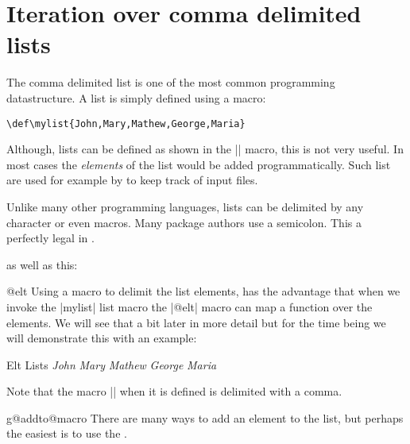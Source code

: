 \section{Iteration over comma delimited lists}

The comma delimited list is one of the most common programming datastructure. A list is simply defined using a macro:

\begin{verbatim}
\def\mylist{John,Mary,Mathew,George,Maria}
\end{verbatim}

Although, lists can be defined as shown in the |\mylist| macro, this is not very useful. In most cases the \textit{elements} of the list would be added programmatically. Such list are used for example by \latex to keep track of input files.

Unlike many other programming languages, lists can be delimited by any character or even macros. Many package authors use a semicolon. This a perfectly legal in \tex.

\begin{teXXX}
\end{teXXX}
as well as this:

\begin{teXXX}
\end{teXXX}

\begin{docCommand}{@elt}{}
Using a macro to delimit the list elements, has the advantage that when we invoke the |mylist| list macro the |@elt| macro can map a function over the elements. We will see that a bit later in more detail but for the time being we will demonstrate this with an example:
\end{docCommand}

\begin{texexample}{Elt Lists}{}
\def\mylist{\@elt John,\@elt Mary,\@elt Mathew, \@elt George, \@elt Maria,}
\def\@elt#1,{\textit{#1} }
\mylist
\end{texexample}

Note that the macro |\@elt| when it is defined is delimited with a comma. 


\begin{docCommand}{g@addto@macro}{}
There are many ways to add an element to the list, but perhaps the easiest is to use the \latex \CMDI{\g@addto@macro}. 
\end{docCommand}

